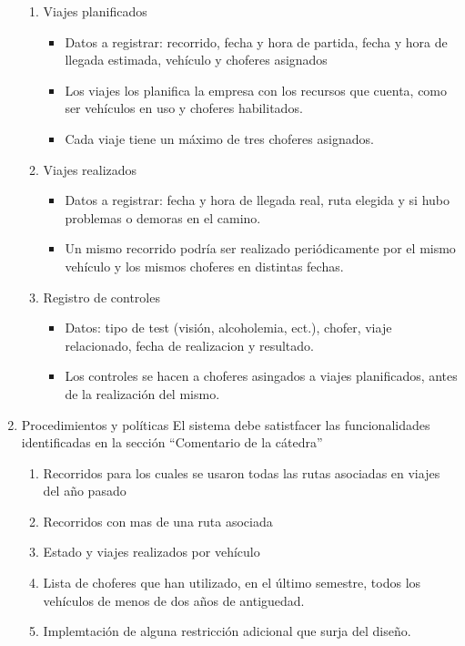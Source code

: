 \begin{enumerate}
  \begin{enumerate}[label=\roman{*}]
  \item Viajes planificados
    \begin{itemize}
      \item Datos a registrar: recorrido, fecha y hora de partida, fecha y hora de llegada estimada, veh\'iculo y choferes asignados
      \item Los viajes los planifica la empresa con los recursos que cuenta, como ser veh\'iculos en uso y choferes habilitados. 
      \item Cada viaje tiene un m\'aximo de tres choferes asignados.
    \end{itemize}  
  \item Viajes realizados
    \begin{itemize}
      \item Datos a registrar: fecha y hora de llegada real, ruta elegida y si hubo problemas o demoras en el camino.
      \item Un mismo recorrido podría ser realizado periódicamente por el mismo vehículo y los mismos choferes en distintas fechas.
    \end{itemize}  
  \item Registro de controles
    \begin{itemize}
      \item Datos: tipo de test (visi\'on, alcoholemia, ect.), chofer, viaje relacionado, fecha de realizacion y resultado.
      \item Los controles se hacen a choferes asingados a viajes planificados, antes de la realizaci\'on del mismo.
    \end{itemize}  
  \end{enumerate}
\item Procedimientos y pol\'iticas
  El sistema debe satistfacer las funcionalidades identificadas en la secci\'on ``Comentario de la c\'atedra''
  \begin{enumerate}[label=\roman{*}]
  \item Recorridos para los cuales se usaron todas las rutas asociadas en viajes del a\~no pasado
  \item Recorridos con mas de una ruta asociada
  \item Estado y viajes realizados por veh\'iculo
  \item Lista de choferes que han utilizado, en el \'ultimo semestre, todos los veh\'iculos de menos de dos a\~nos de antiguedad.
  \item Implemtaci\'on de alguna restricci\'on adicional que surja del dise\~no.
  \end{enumerate}
\end{enumerate}
